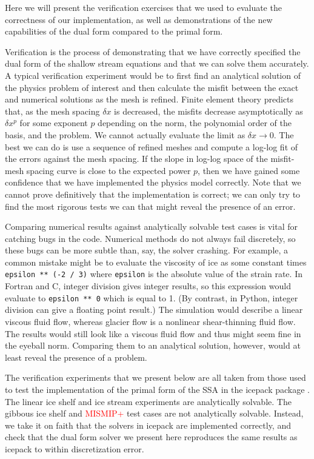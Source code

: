 \documentclass{article}
\theoremstyle{definition}
\theoremstyle{plain}
\begin{document}
Here we will present the verification exercises that we used to evaluate the correctness of our implementation, as well as demonstrations of the new capabilities of the dual form compared to the primal form.

Verification is the process of demonstrating that we have correctly specified the dual form of the shallow stream equations and that we can solve them accurately.
A typical verification experiment would be to first find an analytical solution of the physics problem of interest and then calculate the misfit between the exact and numerical solutions as the mesh is refined.
Finite element theory predicts that, as the mesh spacing $\delta x$ is decreased, the misfits decrease asymptotically as $\delta x^p$ for some exponent $p$ depending on the norm, the polynomial order of the basis, and the problem.
We cannot actually evaluate the limit as $\delta x \to 0$.
The best we can do is use a sequence of refined meshes and compute a log-log fit of the errors against the mesh spacing.
If the slope in log-log space of the misfit-mesh spacing curve is close to the expected power $p$, then we have gained some confidence that we have implemented the physics model correctly.
Note that we cannot prove definitively that the implementation is correct; we can only try to find the most rigorous tests we can that might reveal the presence of an error.

Comparing numerical results against analytically solvable test cases is vital for catching bugs in the code.
Numerical methods do not always fail discretely, so these bugs can be more subtle than, say, the solver crashing.
For example, a common mistake might be to evaluate the viscosity of ice as some constant times \texttt{epsilon ** (-2 / 3)} where \texttt{epsilon} is the absolute value of the strain rate.
In Fortran and C, integer division gives integer results, so this expression would evaluate to \texttt{epsilon ** 0} which is equal to 1.
(By contrast, in Python, integer division can give a floating point result.)
The simulation would describe a linear viscous fluid flow, whereas glacier flow is a nonlinear shear-thinning fluid flow.
The results would still look like a viscous fluid flow and thus might seem fine in the eyeball norm.
Comparing them to an analytical solution, however, would at least reveal the presence of a problem.

The verification experiments that we present below are all taken from those used to test the implementation of the primal form of the SSA in the icepack package \citep{shapero2021icepack}.
The linear ice shelf and ice stream experiments are analytically solvable.
The gibbous ice shelf and \textcolor{red}{MISMIP+} test cases are not analytically solvable.
Instead, we take it on faith that the solvers in icepack are implemented correctly, and check that the dual form solver we present here reproduces the same results as icepack to within discretization error.
\end{document}
